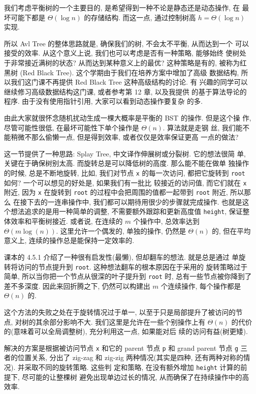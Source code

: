 \documentclass[a4paper]{ctexart}
\theoremstyle{definition}
\theoremstyle{definition}
\begin{document}
我们考虑平衡树的一个主要目的, 是希望得到一种不论是静态还是动态操作, 在
最坏可能下都是 $\Theta(\log n)$ 的存储结构. 而这一点, 通过控制树高
$h = \Theta(\log n)$ 实现.

所以 Avl Tree 的整体思路就是, 确保我们的树, 不会太不平衡, 从而达到一个
可以接受的效率. 从这个意义上说, 我们也可以考虑是否有一种策略, 能够始终
使树处于非常接近满树的状态? 从而达到某种意义上的最优? 这种策略是有的,
被称为红黑树 (Red Black Tree). 这个学期由于我们在培养方案中增加了高级
数据结构, 所以我们这门课不再提供 Red Black Tree 这种高级结构的讨论. 有
兴趣的同学可以继续修习高级数据结构这门课, 或者参考第 12 章, 以及我提供
的基于算法导论的程序. 由于没有使用指针引用, 大家可以看到动态操作要复杂
的多.

由此大家就很怀念随机扰动生成一棵大概率是平衡的 BST 的操作. 但是这个操
作, 尽管可能性很低, 在最坏可能性下单个操作是 $\Theta(n)$. 算法就是走钢
丝, 我们能不能稍微不那么偷懒一点, 但是得到效率, 或者仅仅是效率保证更高
一点的做法?

这一节提供了一种思路: Splay Tree, 中文译作伸展树或分裂树. 它的想法很简
单, 关键在于确保树别太高. 而旋转总是可以降低树的高度. 那么能不能在做单
独操作的时候, 总是不断地旋转, 比如, 我们对节点 \verb|x| 的每一次访问,
都把它旋转到 \verb|root| 如何? 一个可以想见的好处是, 如果我们有一批比
较接近的访问值, 而它们就在 \verb|x| 附近, 因为 \verb|x| 在旋转到
\verb|root| 的过程中会把周围的值都一起带到 \verb|root| 附近, 所以那么
在接下去的一连串操作中, 我们都可以期待用很少的步骤就完成操作. 也就是这
个想法追求的是用一种简单的调整, 不需要额外跟踪和更新高度值
\verb|height|, 保证整体效率和平衡树接近. 或者说, 在连续的 $m$ 个操作中,
总效率达到 $\Theta(m \log(n))$. 这里允许一个偶发的, 单独的操作, 仍然是
$\Theta(n)$ 的, 但在平均意义上, 连续的操作总是能保持一定效率的.

课本的 4.5.1 介绍了一种很有启发性(最懒), 但却翻车的想法. 就是总是通过
单旋转将访问的节点提升到 \verb|root|. 这种想法翻车的根本原因在于采用的
旋转策略过于简单, 所以当你把一个节点从很深的叶子提升到 \verb|root| 时,
总有一些节点被你降到了差不多深度. 因此来回折腾之下, 仍然可以构建出 $m$
个连续操作, 每个操作都是 $\Theta(n)$ 的.

这个方法的失败之处在于旋转情况过于单一, 以至于只是局部提升了被访问的节
点, 对树的其余部分影响不大. 我们这里是允许在一些个别操作上有
$\Theta(n)$ 的代价的(意味着可以全局调整树), 充分利用这一点, 如果能对后
续的访问有益(树更矮).

解决的方案是根据被访问节点 \verb|x| 和它的 parent 节点 \verb|p| 和
grand parent 节点 \verb|g| 三者的位置关系, 分出了 zig-zag 和 zig-zig
两种情况(其实是四种, 还有两种对称的情况). 并采取不同的旋转策略. 这些判
定和策略, 在没有额外增加 \verb|height| 计算的前提下, 尽可能的让整棵树
避免出现单边过长的情况, 从而确保了在持续操作中的高效率.
\end{document}
